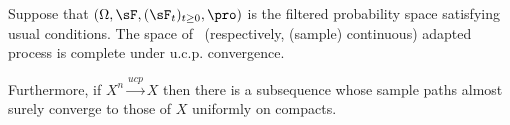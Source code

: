 

\begin{theorem}\label{thm:complete_cadlag_continuous_under_ucp_convergence}
Suppose that $(\Omega,\sF,(\sF_t)_{t\geq 0}, \pro)$ is the filtered probability space satisfying usual conditions. The space of \cadlag\ (respectively, (sample) continuous) adapted process is complete under u.c.p. convergence.

Furthermore, if $X^n \xrightarrow{ucp} X$ then there is a subsequence whose sample paths almost surely converge to those of $X$ uniformly on compacts.
\end{theorem}


